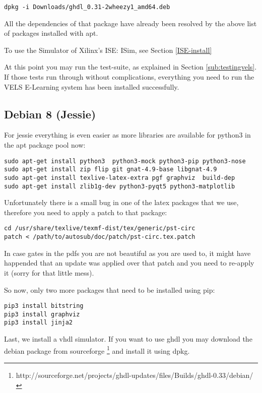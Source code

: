 \begin{verbatim}
dpkg -i Downloads/ghdl_0.31-2wheezy1_amd64.deb
\end{verbatim}

All the dependencies of that package have already been resolved by the above
list of packages installed with apt.

To use the Simulator of Xilinx's ISE: ISim, see Section \ref{ISE-install}

At this point you may run the test-suite, as explained in Section \ref{sub:testingvels}.
If those tests run through without complications, everything you need to run the VELS
E-Learning system has been installed successfully.

\subsection{Debian 8 (Jessie)}

For jessie everything is even easier as more libraries are available for python3 in the
apt package pool now:

\begin{verbatim}
sudo apt-get install python3  python3-mock python3-pip python3-nose
sudo apt-get install zip flip git gnat-4.9-base libgnat-4.9
sudo apt-get install texlive-latex-extra pgf graphviz  build-dep
sudo apt-get install zlib1g-dev python3-pyqt5 python3-matplotlib  
\end{verbatim}

Unfortunately there is a small bug in one of the latex packages that we use,
therefore you need to apply a patch to that package:

\begin{verbatim}
cd /usr/share/texlive/texmf-dist/tex/generic/pst-circ
patch < /path/to/autosub/doc/patch/pst-circ.tex.patch
\end{verbatim}

In case gates in the pdfs you are not beautiful as you are used to, it might have
happended that an update was applied over that patch and you need to re-apply it (sorry for that little mess).

So now, only two more packages that need to be installed using pip:

\begin{verbatim}
pip3 install bitstring
pip3 install graphviz
pip3 install jinja2
\end{verbatim}

Last, we install a vhdl simulator. If you want to use ghdl you may download
the debian package from sourceforge \footnote{http://sourceforge.net/projects/ghdl-updates/files/Builds/ghdl-0.33/debian/}
and install it using dpkg.

